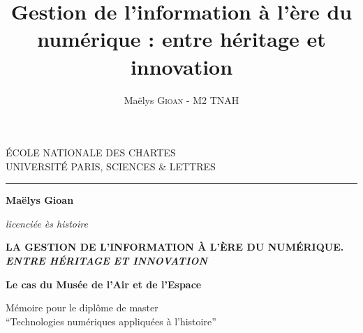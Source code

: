 \documentclass[12pt,twoside]{book}
\author{Maëlys \textsc{Gioan} - M2 TNAH}
\title{Gestion de l'information à l'ère du numérique : entre héritage et innovation}
\begin{document}
	
	
	
	\begin{titlepage}
		\begin{center}
			
			\bigskip
			
			\begin{large}				
				ÉCOLE NATIONALE DES CHARTES\\
				UNIVERSITÉ PARIS, SCIENCES \& LETTRES
			\end{large}
			\begin{center}\rule{2cm}{0.02cm}\end{center}
			
			\bigskip
			\bigskip
			\bigskip
			\begin{Large}
				\textbf{Maëlys Gioan}\\
			\end{Large}
			\begin{normalsize} \textit{licenciée ès histoire}\\
			\end{normalsize}
			
			\bigskip
			\bigskip
			\bigskip
			
			\begin{Huge}
				\MakeUppercase{\textbf{La gestion de l'information à l'ère du numérique.\\ \textit{Entre héritage et innovation}}}\\
			\end{Huge}
			\bigskip
			\bigskip
			\begin{LARGE}
				\textbf{Le cas du Musée de l'Air et de l'Espace}\\
			\end{LARGE}
			
			\bigskip
			\bigskip
			\bigskip
			\begin{large}
			\end{large}
			\vfill
			
			\begin{large}
				Mémoire pour le diplôme de master \\
				\enquote{Technologies numériques appliquées à l'histoire} \\
			\end{large}
			
		\end{center}
	\end{titlepage}
	
\end{document}
